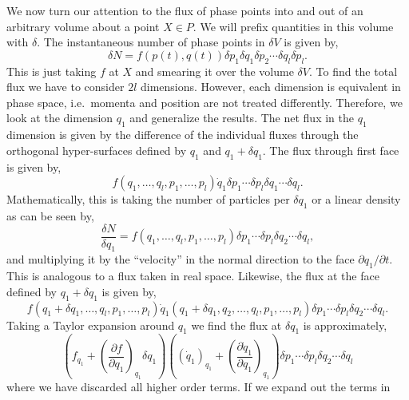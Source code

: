 We now turn our attention to the flux of phase points into and out of an
arbitrary volume about a point $X\in P$. We will prefix quantities in this volume
with $\delta$. The instantaneous number of phase points in $\delta V$ is given
by,
\begin{equation*}
	\delta N = f(p(t),q(t))\delta p_1 \delta q_{1} \delta p_{2} \cdots \delta
	q_{l} \delta p_{l}.
\end{equation*}
This is just taking $f$ at $X$ and smearing it over the volume $\delta V$. To
find the total flux we have to consider $2l$ dimensions. However, each dimension
is equivalent in phase space, i.e.\ momenta and position are not treated
differently. Therefore, we look at the dimension $q_{1}$ and generalize the
results. The net flux in the $q_{1}$ dimension is given by the difference of the
individual fluxes through the orthogonal hyper-surfaces defined by $q_{1}$ and
$q_{1} + \delta q_{1}$. The flux through first face is given by,
\begin{equation*}
	f(q_{1},\ldots,q_{l}, p_{1},\ldots,p_{l})\dot{q}_1 \delta p_1 \cdots \delta p_{l}
	\delta q_1 \cdots \delta q_{l}.
\end{equation*}
Mathematically, this is taking the number of particles per $\delta q_{1}$
or a linear density as can be seen by,
\begin{equation*}
	\frac{\delta N}{\delta q_{1}} = f(q_{1},\ldots,q_{l}, p_{1},\ldots,p_{l})
	\delta p_1 \cdots \delta p_{l} \delta q_2 \cdots \delta q_{l},
\end{equation*}
and multiplying it by the ``velocity'' in the normal direction to the face
$\partial q_{1}/\partial t$. This is analogous to a flux taken in real space.
Likewise, the flux at the face defined by $q_{1} + \delta q_{1}$ is given by,
\begin{equation*}
	f(q_{1} + \delta q_{1},\ldots,q_{l}, p_{1},\ldots,p_{l})
	\dot{q}_{1}(q_{1} + \delta q_{1},q_{2},\ldots,q_{l}, p_{1},\ldots,p_{l})
	\delta p_1 \cdots \delta p_{l} \delta q_2 \cdots \delta q_{l}.
\end{equation*}
Taking a Taylor expansion around $q_{1}$ we find the flux at $\delta q_{1}$ is
approximately,
\begin{equation*}
	\left(f_{q_{1}} + \left(\frac{\partial f}{\partial q_{1}}\right)_{q_{1}}
	\delta q_{1}\right)
	\left((\dot{q}_{1})_{q_{1}} + \left(\frac{\partial \dot{q}_{1}}
	{\partial q_{1}}\right)_{q_{1}}\right)
	\delta p_1 \cdots \delta p_{l} \delta q_2 \cdots \delta q_{l}
\end{equation*}
where we have discarded all higher order terms. If we expand out the terms in
